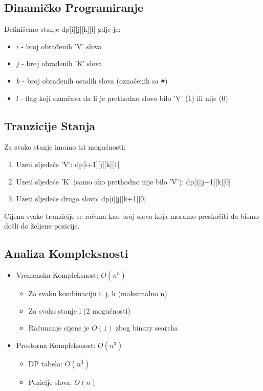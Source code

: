 \subsection{Dinamičko Programiranje}
Definišemo stanje dp[i][j][k][l] gdje je:
\begin{itemize}
    \item $i$ - broj obrađenih 'V' slova
    \item $j$ - broj obrađenih 'K' slova
    \item $k$ - broj obrađenih ostalih slova (označenih sa \texttt{\#})
    \item $l$ - flag koji označava da li je prethodno slovo bilo 'V' (1) ili nije (0)
\end{itemize}

\subsection{Tranzicije Stanja}
Za svako stanje imamo tri mogućnosti:
\begin{enumerate}
    \item Uzeti sljedeće 'V': dp[i+1][j][k][1]
    \item Uzeti sljedeće 'K' (samo ako prethodno nije bilo 'V'): dp[i][j+1][k][0]
    \item Uzeti sljedeće drugo slovo: dp[i][j][k+1][0]
\end{enumerate}

Cijena svake tranzicije se računa kao broj slova koja moramo preskočiti da bismo došli do željene pozicije.

\subsection{Analiza Kompleksnosti}
\begin{itemize}
    \item Vremenska Kompleksnost: $O(n^3)$
        \begin{itemize}
            \item Za svaku kombinaciju i, j, k (maksimalno n)
            \item Za svako stanje l (2 mogućnosti)
            \item Računanje cijene je $O(1)$ zbog binary searcha
        \end{itemize}
    \item Prostorna Kompleksnost: $O(n^3)$
        \begin{itemize}
            \item DP tabela: $O(n^3)$
            \item Pozicije slova: $O(n)$
        \end{itemize}
\end{itemize}

